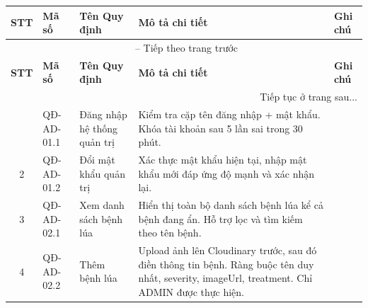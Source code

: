 \documentclass[12pt,a4paper]{article}
\begin{document}
\begin{longtable}{|
        c|
        >{\raggedright\arraybackslash}p{2.4cm}|
        >{\raggedright\arraybackslash}p{3.4cm}|
        >{\raggedright\arraybackslash}p{6.0cm}|
        >{\raggedright\arraybackslash}p{1.4cm}|}

    \hline
    \rowcolor{headerblue}
    \textbf{STT} & \textbf{Mã số} & \textbf{Tên Quy định}        & \textbf{Mô tả chi tiết}                                                                                                                       & \textbf{Ghi chú} \\
    \hline
    \endfirsthead
    \multicolumn{5}{c}{{\tablename\ -- Tiếp theo trang trước}}                                                                                                                                                                      \\
    \hline
    \rowcolor{headerblue}
    \textbf{STT} & \textbf{Mã số} & \textbf{Tên Quy định}        & \textbf{Mô tả chi tiết}                                                                                                                       & \textbf{Ghi chú} \\
    \hline
    \endhead
    \hline \multicolumn{5}{|r|}{{Tiếp tục ở trang sau...}}                                                                                                                                                                          \\ \hline
    \endfoot
    \hline
    \endlastfoot
    1            & QĐ-AD-01.1     & Đăng nhập hệ thống quản trị  & Kiểm tra cặp tên đăng nhập + mật khẩu. Khóa tài khoản sau 5 lần sai trong 30 phút.                                                            &                  \\
    \hline
    2            & QĐ-AD-01.2     & Đổi mật khẩu quản trị        & Xác thực mật khẩu hiện tại, nhập mật khẩu mới đáp ứng độ mạnh và xác nhận lại.                                                                &                  \\
    \hline
    3            & QĐ-AD-02.1     & Xem danh sách bệnh lúa       & Hiển thị toàn bộ danh sách bệnh lúa kể cả bệnh đang ẩn. Hỗ trợ lọc và tìm kiếm theo tên bệnh.                                                 &                  \\
    \hline
    4            & QĐ-AD-02.2     & Thêm bệnh lúa                & Upload ảnh lên Cloudinary trước, sau đó điền thông tin bệnh. Ràng buộc tên duy nhất, severity, imageUrl, treatment. Chỉ ADMIN được thực hiện. &                  \\

\end{longtable}
\end{document}
